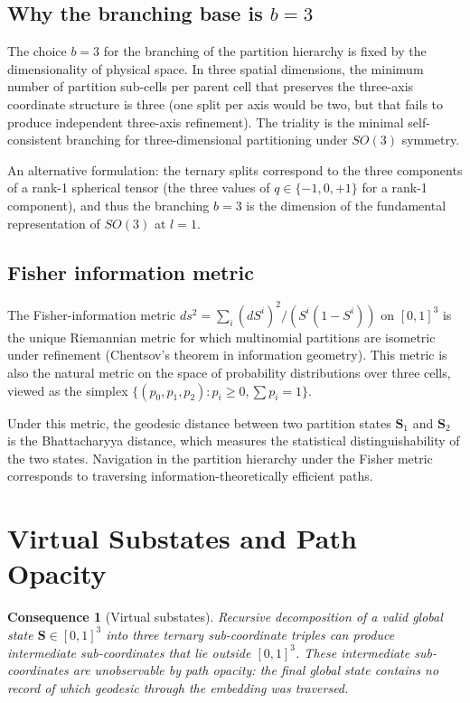 \documentclass[11pt,twocolumn,a4paper]{article}
\theoremstyle{axiomstyle}
\theoremstyle{conseqstyle}
\newtheorem{consequence}{Consequence}
\theoremstyle{definition}
\theoremstyle{remark}
\begin{document}
\subsection{Why the branching base is $b=3$}

The choice $b=3$ for the branching of the partition hierarchy is fixed by the dimensionality of physical space. In three spatial dimensions, the minimum number of partition sub-cells per parent cell that preserves the three-axis coordinate structure is three (one split per axis would be two, but that fails to produce independent three-axis refinement). The triality is the minimal self-consistent branching for three-dimensional partitioning under $SO(3)$ symmetry.

An alternative formulation: the ternary splits correspond to the three components of a rank-1 spherical tensor (the three values of $q\in\{-1,0,+1\}$ for a rank-1 component), and thus the branching $b=3$ is the dimension of the fundamental representation of $SO(3)$ at $l=1$.

\subsection{Fisher information metric}

The Fisher-information metric $ds^{2}=\sum_{i}(dS^{i})^{2}/(S^{i}(1-S^{i}))$ on $[0,1]^{3}$ is the unique Riemannian metric for which multinomial partitions are isometric under refinement (Chentsov's theorem in information geometry). This metric is also the natural metric on the space of probability distributions over three cells, viewed as the simplex $\{(p_{0},p_{1},p_{2}): p_{i}\ge 0, \sum p_{i}=1\}$.

Under this metric, the geodesic distance between two partition states $\mathbf{S}_{1}$ and $\mathbf{S}_{2}$ is the Bhattacharyya distance, which measures the statistical distinguishability of the two states. Navigation in the partition hierarchy under the Fisher metric corresponds to traversing information-theoretically efficient paths.

\section{Virtual Substates and Path Opacity}
\label{sec:virtualsubstates}

\begin{consequence}[Virtual substates]
\label{cons:virtualsubstates}
Recursive decomposition of a valid global state $\mathbf{S}\in[0,1]^{3}$ into three ternary sub-coordinate triples can produce intermediate sub-coordinates that lie outside $[0,1]^{3}$. These intermediate sub-coordinates are unobservable by path opacity: the final global state contains no record of which geodesic through the embedding was traversed.
\end{consequence}
\end{document}
